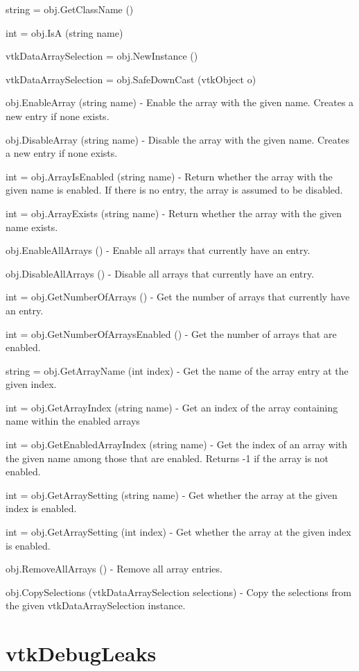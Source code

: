 \begin{DoxyItemize}
\item {\ttfamily string = obj.\-Get\-Class\-Name ()}  
\item {\ttfamily int = obj.\-Is\-A (string name)}  
\item {\ttfamily vtk\-Data\-Array\-Selection = obj.\-New\-Instance ()}  
\item {\ttfamily vtk\-Data\-Array\-Selection = obj.\-Safe\-Down\-Cast (vtk\-Object o)}  
\item {\ttfamily obj.\-Enable\-Array (string name)} -\/ Enable the array with the given name. Creates a new entry if none exists.  
\item {\ttfamily obj.\-Disable\-Array (string name)} -\/ Disable the array with the given name. Creates a new entry if none exists.  
\item {\ttfamily int = obj.\-Array\-Is\-Enabled (string name)} -\/ Return whether the array with the given name is enabled. If there is no entry, the array is assumed to be disabled.  
\item {\ttfamily int = obj.\-Array\-Exists (string name)} -\/ Return whether the array with the given name exists.  
\item {\ttfamily obj.\-Enable\-All\-Arrays ()} -\/ Enable all arrays that currently have an entry.  
\item {\ttfamily obj.\-Disable\-All\-Arrays ()} -\/ Disable all arrays that currently have an entry.  
\item {\ttfamily int = obj.\-Get\-Number\-Of\-Arrays ()} -\/ Get the number of arrays that currently have an entry.  
\item {\ttfamily int = obj.\-Get\-Number\-Of\-Arrays\-Enabled ()} -\/ Get the number of arrays that are enabled.  
\item {\ttfamily string = obj.\-Get\-Array\-Name (int index)} -\/ Get the name of the array entry at the given index.  
\item {\ttfamily int = obj.\-Get\-Array\-Index (string name)} -\/ Get an index of the array containing name within the enabled arrays  
\item {\ttfamily int = obj.\-Get\-Enabled\-Array\-Index (string name)} -\/ Get the index of an array with the given name among those that are enabled. Returns -\/1 if the array is not enabled.  
\item {\ttfamily int = obj.\-Get\-Array\-Setting (string name)} -\/ Get whether the array at the given index is enabled.  
\item {\ttfamily int = obj.\-Get\-Array\-Setting (int index)} -\/ Get whether the array at the given index is enabled.  
\item {\ttfamily obj.\-Remove\-All\-Arrays ()} -\/ Remove all array entries.  
\item {\ttfamily obj.\-Copy\-Selections (vtk\-Data\-Array\-Selection selections)} -\/ Copy the selections from the given vtk\-Data\-Array\-Selection instance.  
\end{DoxyItemize}\hypertarget{vtkcommon_vtkdebugleaks}{}\section{vtk\-Debug\-Leaks}\label{vtkcommon_vtkdebugleaks}
